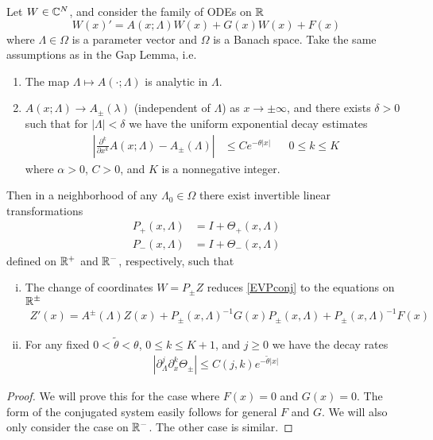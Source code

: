 \documentclass[thesis.tex]{subfiles}
\begin{document}
\begin{lemma}\label{conjlemma}
Let $W \in \mathbb{C}^N$, and consider the family of ODEs on $\mathbb{R}$
\begin{equation}\label{EVPconj}
W(x)' = A(x; \Lambda) W(x) + G(x)W(x) + F(x)
\end{equation}
where $\Lambda \in \Omega$ is a parameter vector and $\Omega$ is a Banach space. Take the same assumptions as in the Gap Lemma, i.e. 
\begin{enumerate}
	\item The map $\Lambda \mapsto A(\cdot; \Lambda)$ is analytic in $\Lambda$.
	\item $A(x; \Lambda) \rightarrow A_\pm(\lambda)$ (independent of $\Lambda$) as $x \rightarrow \pm \infty$, and there exists $\delta > 0$ such that for $|\Lambda| < \delta$ we have the uniform exponential decay estimates 
	\begin{align}
	\left| \frac{\partial^k}{\partial x^k} A(x; \Lambda) - A_\pm(\Lambda) \right| 
	&\leq C e^{-\theta |x|} && 0 \leq k \leq K
	\end{align}
	where $\alpha > 0$, $C > 0$, and $K$ is a nonnegative integer.
\end{enumerate}
Then in a neighborhood of any $\Lambda_0 \in \Omega$ there exist invertible linear transformations
\begin{equation}\label{conjlemmaP}
\begin{aligned}
P_+(x, \Lambda) &= I + \Theta_+(x, \Lambda) \\
P_-(x, \Lambda) &= I + \Theta_-(x, \Lambda) 
\end{aligned}
\end{equation}
defined on $\mathbb{R}^+$ and $\mathbb{R}^-$, respectively, such that
\begin{enumerate}[(i)]
\item The change of coordinates $W = P_\pm Z$ reduces \eqref{EVPconj} to the equations on $\mathbb{R}^\pm$
\begin{align}\label{conjZ}
Z'(x) = A^\pm(\Lambda) Z(x) + P_\pm(x, \Lambda)^{-1} G(x) P_\pm(x, \Lambda) + P_\pm(x, \Lambda)^{-1} F(x)
\end{align}

\item For any fixed $0 < \tilde{\theta} < \theta$, $0 \leq k \leq K+1$, and $j \geq 0$ we have the decay rates
\begin{align}\label{conjthetadecay}
\left| \partial_\Lambda^j \partial_x^k \Theta_\pm \right| \leq C(j, k)e^{-\tilde{\theta}|x|}
\end{align}
\end{enumerate}
\begin{proof}
We will prove this for the case where $F(x) = 0$ and $G(x) = 0$. The form of the conjugated system easily follows for general $F$ and $G$. We will also only consider the case on $\mathbb{R}^-$. The other case is similar. 


\end{proof}
\end{lemma}
\end{document}
